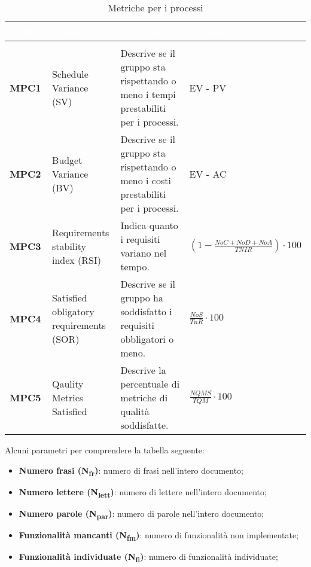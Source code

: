 \renewcommand{\arraystretch}{1.5}
\renewcommand\extrarowheight{1.5pt}
\begin{longtable}{C{1.5cm} | C{4.5cm} C{5.5cm} C{4.5cm}}
		\textcolor{white}{\textbf{Codice}} & 
		\textcolor{white}{\textbf{Nome}} & 
		\textcolor{white}{\textbf{Descrizione}} & 
		\textcolor{white}{\textbf{Formula}} \\
		\endfirsthead
		\\
	    \endfoot
	    \caption{Metriche per i processi}
	    \endlastfoot
		\hline
		\textbf{MPC1} & 
		Schedule Variance (SV)  & 
		Descrive se il gruppo sta rispettando o meno i tempi prestabiliti per i processi. & 
		EV - PV \\
		\textbf{MPC2} & 
		Budget Variance (BV) & 
		Descrive se il gruppo sta rispettando o meno i costi prestabiliti per i processi. & 
		EV - AC \\
		\textbf{MPC3} &
		Requirements stability index (RSI) &
		Indica quanto i requisiti variano nel tempo. &
		$(1 - \frac{NoC + NoD + NoA}{TNIR}) \cdot 100$ \\
		\textbf{MPC4} &
		Satisfied obligatory requirements (SOR) &
		Descrive se il gruppo ha soddisfatto i requisiti obbligatori o meno. &
		$\frac{NoS}{TnR} \cdot 100$ \\ 
		\textbf{MPC5} &
		Qaulity Metrics Satisfied &
		Descrive la percentuale di metriche di qualità soddisfatte. &
		$\frac{NQMS}{TQM} \cdot 100$
\end{longtable}

Alcuni parametri per comprendere la tabella seguente:
\begin{itemize}
	\item \textbf{Numero frasi (N\textsubscript{fr})}: numero di frasi nell'intero documento;
	\item \textbf{Numero lettere (N\textsubscript{lett})}: numero di lettere nell'intero documento;
	\item \textbf{Numero parole (N\textsubscript{par})}: numero di parole nell'intero documento;
	\item \textbf{Funzionalità mancanti (N\textsubscript{fm})}: numero di funzionalità non implementate;
	\item \textbf{Funzionalità individuate (N\textsubscript{fi})}: numero di funzionalità individuate;
\end{itemize}

